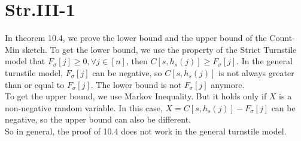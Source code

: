 \section*{Str.III-1}
In theorem 10.4, we prove the lower bound and the upper bound of the Count-Min sketch. To get the lower bound, we use the property of the Strict Turnstile model that $F_\sigma [j] \geq 0, \forall j \in [n]$, then $C[s, h_s(j)] \geq F_\sigma [j]$. In the general turnstile model, $F_\sigma[j]$ can be negative, so 
$C[s, h_s(j)]$ is not always greater than or equal to $F_\sigma [j]$. The lower bound is not $F_\sigma [j]$ anymore. \\

To get the upper bound, we use Markov Inequality. But it holds only if $X$ is a non-negative random variable. In this case, $X = C[s, h_s(j)] - F_\sigma [j]$ can be negative, so the upper bound can also be different. \\

So in general, the proof of 10.4 does not work in the general turnstile model.
